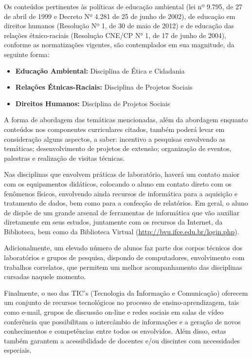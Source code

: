 \documentclass{paper}
\begin{document}
Os conteúdos pertinentes às políticas de educação ambiental (lei nº 9.795, de 27 de abril de 1999 e Decreto Nº 4.281 de 25 de junho de 2002), de educação em direitos humanos (Resolução Nº 1, de 30 de maio de 2012) e de educação das relações étnico-raciais (Resolução CNE/CP N° 1, de 17 de junho de 2004), conforme as normatizações vigentes, são contemplados em sua magnitude, da seguinte forma:

\begin{itemize}
\item \textbf{Educação Ambiental:} Disciplina de Ética e Cidadania 
\item \textbf{Relações Étnicas-Raciais:} Disciplina de Projetos Sociais 
\item \textbf{Direitos Humanos:} Disciplina de Projetos Sociais
\end{itemize}

A forma de abordagem das temáticas mencionadas, além da abordagem enquanto conteúdos nos componentes curriculares citados, também poderá levar em consideração alguns aspectos, a saber: incentivo a pesquisas envolvendo as temáticas; desenvolvimento de projetos de extensão; organização de eventos, palestras e realização de visitas técnicas.

Nas disciplinas que envolvem práticas de laboratório, haverá um contato maior com os equipamentos didáticos, colocando o aluno em contato direto com os fenômenos físicos, envolvendo ainda recursos de informática para a aquisição e tratamento de dados, bem como para a confecção de relatórios. Em geral, o aluno de \NOMEENG dispõe de um grande arsenal de ferramentas de informática que vão auxiliar diretamente em seus estudos, juntamente com os recursos da Internet, da Biblioteca, bem como da Biblioteca Virtual (\href{http://bvu.ifce.edu.br/login.php}{http://bvu.ifce.edu.br/login.php}). 

Adicionalmente, um elevado número de alunos faz parte dos corpos técnicos dos laboratórios e grupos de pesquisa, dispondo de computadores, envolvimento com trabalhos correlatos, que permitem um melhor acompanhamento das disciplinas cursadas naquele momento. 

Finalmente, o uso das TIC's (Tecnologia da Informação e Comunicação) oferecem um conjunto de recursos tecnológicos no processo de ensino-aprendizagem, tais como e-mail, grupos de discussão on-line e redes sociais em salas de vídeo conferência que possibilitam o intercâmbio de informações e a geração de novos conhecimentos e competências entre todos os envolvidos. Além disso, estas também garantem a acessibilidade de docentes e/ou discintes com necessidades especiais.
\end{document}

